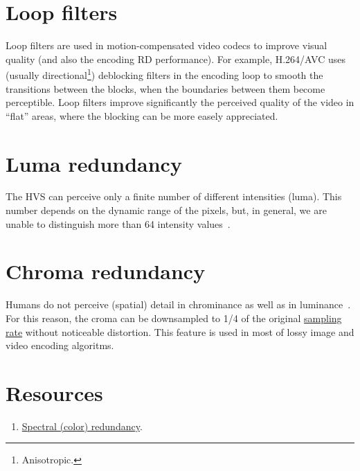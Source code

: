 \section{Loop filters}

Loop filters are used in motion-compensated video codecs to improve
visual quality (and also the encoding RD performance). For example,
H.264/AVC uses (usually directional\footnote{Anisotropic.})
deblocking filters in the encoding loop to smooth the transitions
between the blocks, when the boundaries between them become
perceptible. Loop filters improve significantly the perceived quality
of the video in ``flat'' areas, where the blocking can be more easely
appreciated.

\section{Luma redundancy}

The HVS can perceive only a finite number of different intensities
(luma). This number depends on the dynamic range of the pixels, but, in
general, we are unable to distinguish more than 64 intensity
values~\cite{vruiz__visual_redundancy}.

\section{Chroma redundancy}

Humans do not perceive (spatial) detail in chrominance as well as in
luminance~\cite{burger2016digital}. For this reason, the croma can be
downsampled to 1/4 of the original
\href{https://en.wikipedia.org/wiki/Sampling_(signal_processing)}{sampling
  rate} without noticeable distortion. This feature is used in most of
lossy image and video encoding algoritms.

\section{Resources}
\begin{enumerate}
\item \href{https://github.com/vicente-gonzalez-ruiz/color_transforms/blob/main/docs/color_redundancy.ipynb}{Spectral
    (color) redundancy}.
\end{enumerate}

